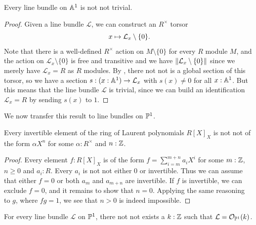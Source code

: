 \begin{corollary}
  \label{line-bundle-A1-notnot-trivial}
  Every line bundle on $\mathbb{A}^1$ is not not trivial.
\end{corollary}

\begin{proof}
  Given a line bundle $\mathcal{L}$,
  we can construct an $R^\times$ torsor
  \[ x \mapsto \mathcal{L}_x \setminus \{0\} \rlap{.} \]
  Note that there is a well-defined $R^\times$ action on $M \setminus \{0\}$
  for every $R$ module $M$,
  and the action on $\mathcal{L}_x \setminus \{0\}$ is free and transitive
  and we have $\lVert \mathcal{L}_x \setminus \{0\} \rVert$
  since we merely have $\mathcal{L}_x = R$ as $R$ modules.
  By ,
  there not not is a global section of this torsor,
  so we have a section $s : (x : \mathbb{A}^1) \to \mathcal{L}_x$
  with $s(x) \neq 0$ for all $x : \mathbb{A}^1$.
  But this means that the line bundle $\mathcal{L}$ is trivial,
  since we can build an identification $\mathcal{L}_x = R$
  by sending $s(x)$ to $1$.
\end{proof}

We now transfer this result to line bundles on $\mathbb{P}^1$.

\begin{lemma}
  \label{invertible-laurent-polynomials}
  Every invertible element of the ring of Laurent polynomials $R[X]_X$
  is not not of the form $\alpha X^n$
  for some $\alpha : R^{\times}$ and $n : \mathbb{Z}$.
\end{lemma}

\begin{proof}
  Every element $f : R[X]_X$ is of the form
  $f = \sum_{i = m}^{m + n} a_i X^i$
  for some $m : \mathbb{Z}$, $n \geq 0$ and $a_i : R$.
  Every $a_i$ is not not either $0$ or invertible.
  Thus we can assume that either $f = 0$ or
  both $a_m$ and $a_{m+n}$ are invertible.
  If $f$ is invertible, we can exclude $f = 0$,
  and it remains to show that $n = 0$.
  Applying the same reasoning to $g$,
  where $fg = 1$,
  we see that $n > 0$ is indeed impossible.
\end{proof}

\begin{theorem}
  For every line bundle $\mathcal{L}$ on $\mathbb{P}^1$,
  there not not exists a $k : \mathbb{Z}$
  such that $\mathcal{L} = \mathcal{O}_{\mathbb{P}^1}(k)$.
\end{theorem}


